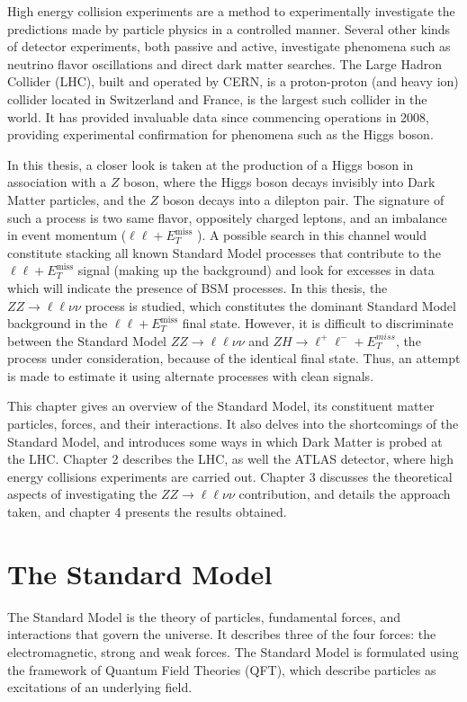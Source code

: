 \documentclass[12pt,a4paper,openright,twoside]{report}
\newcommand{\ZZ}{$ZZ\to \ell\ell\nu\nu$ }
\newcommand{\llM}{$\ell\ell+E_T^{\mathrm{miss}}$ }
\begin{document}
High energy collision experiments are a method to experimentally investigate the predictions made by particle physics in a controlled manner. Several other kinds of detector experiments, both passive and active, investigate phenomena such as neutrino flavor oscillations and direct dark matter searches. The Large Hadron Collider (LHC), built and operated by CERN, is a proton-proton (and heavy ion) collider located in Switzerland and France, is the largest such collider in the world. It has provided invaluable data since commencing operations in 2008, providing experimental confirmation for phenomena such as the Higgs boson.

In this thesis, a closer look is taken at the production of a Higgs boson in association with a $Z$ boson, where the Higgs boson decays invisibly into Dark Matter particles, and the $Z$ boson decays into a dilepton pair. The signature of such a process is two same flavor, oppositely charged leptons, and an imbalance in event momentum (\llM). A possible search in this channel would constitute stacking all known Standard Model processes that contribute to the \llM signal (making up the background) and look for excesses in data which will indicate the presence of BSM processes. In this thesis, the \ZZ process is studied, which constitutes the dominant Standard Model background in the \llM final state. However, it is difficult to discriminate between the Standard Model \ZZ and $ZH\to \ell^+\ell^-+E_T^{miss}$, the process under consideration, because of the identical final state. Thus, an attempt is made to estimate it using alternate processes with clean signals. 

This chapter gives an overview of the Standard Model, its constituent matter particles, forces, and their interactions. It also delves into the shortcomings of the Standard Model, and introduces some ways in which Dark Matter is probed at the LHC. Chapter 2 describes the LHC, as well the ATLAS detector, where high energy collisions experiments are carried out. Chapter 3 discusses the theoretical aspects of investigating the \ZZ contribution, and details the approach taken, and chapter 4 presents the results obtained.

\section{The Standard Model}
The Standard Model is the theory of particles, fundamental forces, and interactions that govern the universe. It describes three of the four forces: the electromagnetic, strong and weak forces. The Standard Model is formulated using the framework of Quantum Field Theories (QFT), which describe particles as excitations of an underlying field.
\end{document}
